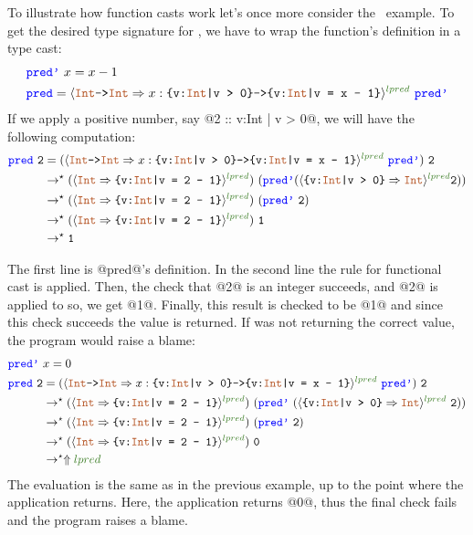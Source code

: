 To illustrate how function casts work let's once more consider 
the \predname\ example.
%
To get the desired type signature for \predname, 
we have to wrap the function's definition 
in a type cast:
\begin{align*}
& \prednamep\ x= x - 1 \\
& \predname  = \ecast{\tyint \texttt{->} \tyint}{x:\ttpos \texttt{->} \ttpred{x}}{lpred} \ \prednamep
\end{align*}
If we apply a positive number, say @2 :: {v:Int | v > 0}@, we will have the following computation:
%
\begin{align*}
\predname\ \texttt{2} &=
(\ecast{\tyint \texttt{->} \tyint}{x:\ttpos \texttt{->} \ttpred{x}}{lpred} \ \prednamep)\ \texttt{2} \\
&\rightarrow^\star (\ecast{\tyint}{\ttpred{2}}{lpred}) \ (\prednamep(\ecast{\ttpos}{\tyint}{lpred}\texttt{2})) \\ 
&\rightarrow^\star (\ecast{\tyint}{\ttpred{2}}{lpred}) \ (\prednamep\ \texttt{2}) \\ 
&\rightarrow^\star (\ecast{\tyint}{\ttpred{2}}{lpred}) \ \texttt{1} \\ 
&\rightarrow^\star \texttt{1} \\ 
\end{align*}

The first line is @pred@'s definition. In the second line the rule for functional cast is applied.
Then, the check that @2@ is an integer succeeds, and @2@ is applied to \prednamep
so, we get @1@.
Finally, this result is checked to be @1@ and since this check succeeds the value is returned.
%
If \prednamep was not returning the correct value, the program would raise a blame:
\begin{align*}
\prednamep\ & x= 0 \\
\predname\ \texttt{2} &=
(\ecast{\tyint \texttt{->} \tyint}{x:\ttpos \texttt{->} \ttpred{x}}{lpred} \ \prednamep)\ \texttt{2} \\
&\rightarrow^\star (\ecast{\tyint}{\ttpred{2}}{lpred}) \ (\prednamep\ (\ecast{\ttpos}{\tyint}{lpred} \ \texttt{2})) \\ 
&\rightarrow^\star (\ecast{\tyint}{\ttpred{2}}{lpred}) \ (\prednamep\ \texttt{2}) \\ 
&\rightarrow^\star (\ecast{\tyint}{\ttpred{2}}{lpred}) \ \texttt{0} \\ 
&\rightarrow^\star \elabel{lpred} \\ 
\end{align*}
The evaluation is the same as in the previous example, 
up to the point where the \prednamep application returns.
Here, the application returns @0@, thus the final check fails 
and the program raises a blame.


